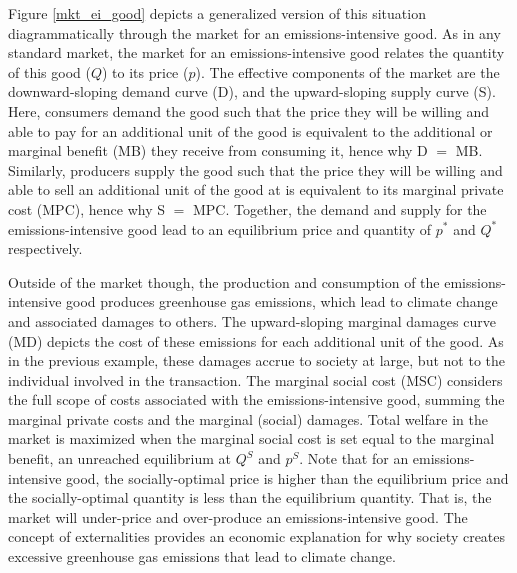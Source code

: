 Figure \ref{mkt_ei_good} depicts a generalized version of this situation diagrammatically through the market for an emissions-intensive good. As in any standard market, the market for an emissions-intensive good relates the quantity of this good ($Q$) to its price ($p$). The effective components of the market are the downward-sloping demand curve (D), and the upward-sloping supply curve (S). Here, consumers demand the good such that the price they will be willing and able to pay for an additional unit of the good is equivalent to the additional or marginal benefit (MB) they receive from consuming it, hence why D $=$ MB. Similarly, producers supply the good such that the price they will be willing and able to sell an additional unit of the good at is equivalent to its marginal private cost (MPC), hence why S $=$ MPC. Together, the demand and supply for the emissions-intensive good lead to an equilibrium price and quantity of $p^*$ and $Q^*$ respectively. 

Outside of the market though, the production and consumption of the emissions-intensive good produces greenhouse gas emissions, which lead to climate change and associated damages to others. The upward-sloping marginal damages curve (MD) depicts the cost of these emissions for each additional unit of the good. As in the previous example, these damages accrue to society at large, but not to the individual involved in the transaction. The marginal social cost (MSC) considers the full scope of costs associated with the emissions-intensive good, summing the marginal private costs and the marginal (social) damages. Total welfare in the market is maximized when the marginal social cost is set equal to the marginal benefit, an unreached equilibrium at $Q^S$ and $p^S$. Note that for an emissions-intensive good, the socially-optimal price is higher than the equilibrium price and the socially-optimal quantity is less than the equilibrium quantity. That is, the market will under-price and over-produce an emissions-intensive good. The concept of externalities provides an economic explanation for why society creates excessive greenhouse gas emissions that lead to climate change. 

